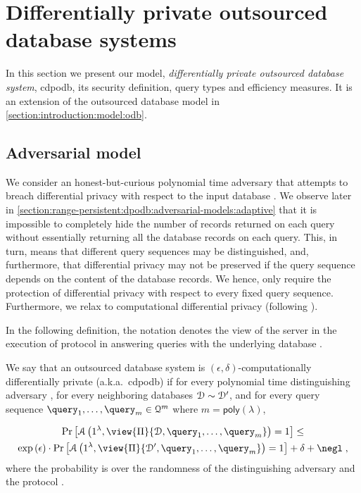 \section{Differentially private outsourced database systems}\label{section:range-persistent:dpodb}

	In this section we present our model, \emph{differentially private outsourced database system}, \acrshort{cdpodb}, its security definition, query types and efficiency measures.
	It is an extension of the outsourced database model in \cref{section:introduction:model:odb}.

	\subsection{Adversarial model}\label{section:range-persistent:dpodb:adversarial-models}

		We consider an honest-but-curious polynomial time adversary that attempts to breach differential privacy with respect to the input database \database{}.
		We observe later in \cref{section:range-persistent:dpodb:adversarial-models:adaptive} that it is impossible to completely hide the number of records returned on each query without essentially returning all the database records on each query.
		This, in turn, means that different query sequences may be distinguished, and, furthermore, that differential privacy may not be preserved if the query sequence depends on the content of the database records.
		We hence, only require the protection of differential privacy with respect to every fixed query sequence.
		Furthermore, we relax to computational differential privacy (following \cite{computational-dp}).

		In the following definition, the notation  denotes the view of the server \server{} in the execution of protocol \protocol{} in answering queries  with the underlying database \database{}.

		\begin{definition}
			We say that an outsourced database system \protocol{} is $(\epsilon, \delta)$\hyp{}computationally differentially private (a.k.a.~\acrshort{cdpodb}) if for every polynomial time distinguishing adversary \adversary{}, for every neighboring databases $\mathcal{D} \sim \mathcal{D}^\prime$, and for every query sequence $\fromNtoM{\query}{1}{m} \in \querySet^m$ where $m = \mathsf{poly}(\lambda)$,

			\begin{multline*}
				\probability{\adversary \left( 1^\lambda, \view{\protocol{}}{\database, \fromNtoM{\query}{1}{m}} \right) = 1 } \leq \\
				\exp{(\epsilon)} \cdot \probability{\adversary \left( 1^\lambda, \view{\protocol{}}{\database^\prime, \fromNtoM{\query}{1}{m}} \right) = 1} + \delta +\negl \; ,
			\end{multline*}
			where the probability is over the randomness of the distinguishing adversary \adversary{} and the protocol \protocol{}.
		\end{definition}

